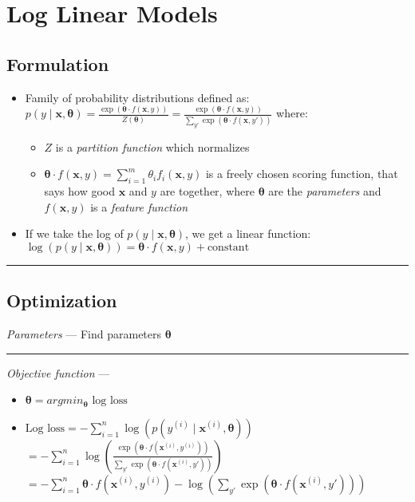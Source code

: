 \section{Log Linear Models}
\subsection*{Formulation}
\begin{itemize}
    \item Family of probability distributions defined as:
    $p(y \mid \boldsymbol{x}, \boldsymbol{\theta}) = \frac{\exp(\boldsymbol{\theta} \cdot f(\boldsymbol{x}, y))}{Z(\boldsymbol{\theta})} = \frac{\exp(\boldsymbol{\theta} \cdot f(\boldsymbol{x}, y))}{\sum_{y'} \exp(\boldsymbol{\theta} \cdot f(\boldsymbol{x}, y'))}$ where:
    \begin{itemize}
        \item $Z$ is a \emph{partition function} which normalizes 
        \item $\boldsymbol{\theta} \cdot f(\boldsymbol{x}, y) = \sum_{i=1}^m \theta_i f_i(\boldsymbol{x}, y)$ is a freely chosen scoring function, that says how good $\boldsymbol{x}$ and $y$ are together, where $\boldsymbol{\theta}$ are the \emph{parameters} and $f(\boldsymbol{x}, y)$ is a \emph{feature function}
    \end{itemize}
    \item If we take the log of $p(y \mid \boldsymbol{x}, \boldsymbol{\theta})$, we get a linear function: $\log(p(y \mid \boldsymbol{x}, \boldsymbol{\theta})) = \boldsymbol{\theta} \cdot f(\boldsymbol{x}, y) + \textrm{constant}$
\end{itemize}

{\color{black}\hrule height 0.001mm}

\subsection*{Optimization}
\emph{Parameters} --- Find parameters $\boldsymbol{\theta}$

{\color{lightgray}\hrule height 0.001mm}

\emph{Objective function} --- 
\begin{itemize}
    \item $
    \boldsymbol{\theta} = argmin_{\boldsymbol{\theta}} \textrm{ log loss}
    $
    \item $\textrm{Log loss} = -\sum_{i=1}^n \log(p(y^{(i)} \mid \boldsymbol{x}^{(i)}, \boldsymbol{\theta}))$
    $
    = -\sum_{i=1}^n \log(\frac{\exp(\boldsymbol{\theta} \cdot f(\boldsymbol{x}^{(i)}, y^{(i)}))}{\sum_{y'} \exp(\boldsymbol{\theta} \cdot f(\boldsymbol{x}^{(i)}, y'))})
    $
    $
    = -\sum_{i=1}^n \boldsymbol{\theta} \cdot f(\boldsymbol{x}^{(i)}, y^{(i)}) - \log(\sum_{y'} \exp(\boldsymbol{\theta} \cdot f(\boldsymbol{x}^{(i)}, y')))
    $
\end{itemize}

